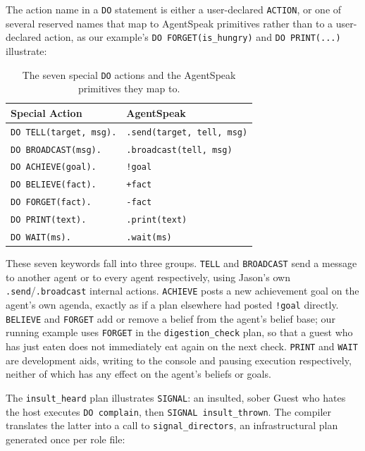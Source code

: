 The action name in a \lstinline|DO| statement is either a user-declared \lstinline|ACTION|, or one of several reserved names that map to AgentSpeak primitives rather than to a user-declared action, as our example's \lstinline|DO FORGET(is_hungry)| and \lstinline|DO PRINT(...)| illustrate:

\begin{table}[h]
\centering
\begin{tabular}{|l|l|}
\hline
\textbf{Special Action} & \textbf{AgentSpeak} \\
\hline
\lstinline|DO TELL(target, msg).| & \lstinline|.send(target, tell, msg)| \\
\lstinline|DO BROADCAST(msg).| & \lstinline|.broadcast(tell, msg)| \\
\lstinline|DO ACHIEVE(goal).| & \lstinline|!goal| \\
\lstinline|DO BELIEVE(fact).| & \lstinline|+fact| \\
\lstinline|DO FORGET(fact).| & \lstinline|-fact| \\
\lstinline|DO PRINT(text).| & \lstinline|.print(text)| \\
\lstinline|DO WAIT(ms).| & \lstinline|.wait(ms)| \\
\hline
\end{tabular}
\caption{The seven special \lstinline|DO| actions and the AgentSpeak primitives they map to.}
\label{tab:special-action-mapping}
\end{table}

These seven keywords fall into three groups. \lstinline|TELL| and \lstinline|BROADCAST| send a message to another agent or to every agent respectively, using Jason's own \lstinline|.send|/\lstinline|.broadcast| internal actions. \lstinline|ACHIEVE| posts a new achievement goal on the agent's own agenda, exactly as if a plan elsewhere had posted \lstinline|!goal| directly. \lstinline|BELIEVE| and \lstinline|FORGET| add or remove a belief from the agent's belief base; our running example uses \lstinline|FORGET| in the \lstinline|digestion_check| plan, so that a guest who has just eaten does not immediately eat again on the next check. \lstinline|PRINT| and \lstinline|WAIT| are development aids, writing to the console and pausing execution respectively, neither of which has any effect on the agent's beliefs or goals.

The \lstinline|insult_heard| plan illustrates \lstinline|SIGNAL|: an insulted, sober Guest who hates the host executes \lstinline|DO complain|, then \lstinline|SIGNAL insult_thrown|. The compiler translates the latter into a call to \lstinline|signal_directors|, an infrastructural plan generated once per role file:

